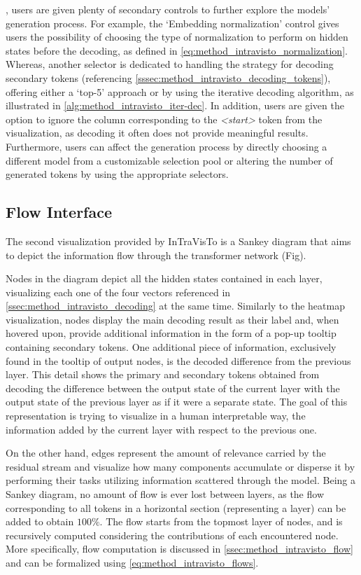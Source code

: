 , users are given plenty of secondary controls to further explore the models' generation process.
For example, the `Embedding normalization' control gives users the possibility of choosing the type of normalization to perform on hidden states before the decoding, as defined in \cref{eq:method_intravisto_normalization}.
Whereas, another selector is dedicated to handling the strategy for decoding secondary tokens (referencing \cref{sssec:method_intravisto_decoding_tokens}), offering either a `top-5' approach or by using the iterative decoding algorithm, as illustrated in \cref{alg:method_intravisto_iter-dec}.
In addition, users are given the option to ignore the column corresponding to the \emph{<start>} token from the visualization, as decoding it often does not provide meaningful results.
Furthermore, users can affect the generation process by directly choosing a different model from a customizable selection pool or altering the number of generated tokens by using the appropriate selectors.

\subsection{Flow Interface}\label{sec:exp_intravisto_exp2}


The second visualization provided by InTraVisTo is a Sankey diagram that aims to depict the information flow through the transformer network (Fig).

Nodes in the diagram depict all the hidden states contained in each layer, visualizing each one of the four vectors referenced in \cref{ssec:method_intravisto_decoding} at the same time.
Similarly to the heatmap visualization, nodes display the main decoding result as their label and, when hovered upon, provide additional information in the form of a pop-up tooltip containing secondary tokens.
One additional piece of information, exclusively found in the tooltip of output nodes, is the decoded difference from the previous layer.
This detail shows the primary and secondary tokens obtained from decoding the difference between the output state of the current layer with the output state of the previous layer as if it were a separate state.
The goal of this representation is trying to visualize in a human interpretable way, the information added by the current layer with respect to the previous one.

On the other hand, edges represent the amount of relevance carried by the residual stream and visualize how many components accumulate or disperse it by performing their tasks utilizing information scattered through the model.
Being a Sankey diagram, no amount of flow is ever lost between layers, as the flow corresponding to all tokens in a horizontal section (representing a layer) can be added to obtain $100\%$.
The flow starts from the topmost layer of nodes, and is recursively computed considering the contributions of each encountered node.
More specifically, flow computation is discussed  in \cref{ssec:method_intravisto_flow} and can be formalized using \cref{eq:method_intravisto_flows}.

